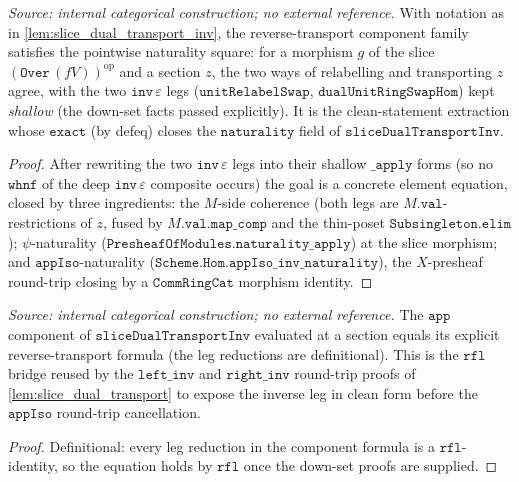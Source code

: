 \begin{lemma}
  \label{lem:slice_dual_transport_inv_naturality_apply}
  \textit{Source: internal categorical construction; no external reference.}
  With notation as in \cref{lem:slice_dual_transport_inv}, the reverse-transport component
  family satisfies the pointwise naturality square: for a morphism \(g\) of the slice
  \((\mathtt{Over}\,(fV))^{\mathrm{op}}\) and a section \(z\), the two ways of relabelling
  and transporting \(z\) agree, with the two \(\mathtt{inv}\,\varepsilon\) legs
  (\(\mathtt{unitRelabelSwap}\), \(\mathtt{dualUnitRingSwapHom}\)) kept \emph{shallow} (the
  down-set facts passed explicitly). It is the clean-statement extraction whose \(\mathtt{exact}\)
  (by defeq) closes the \(\mathtt{naturality}\) field of \(\mathtt{sliceDualTransportInv}\).
\end{lemma}
\begin{proof}
  \leanok
  After rewriting the two \(\mathtt{inv}\,\varepsilon\) legs into their shallow \(\mathtt{\_apply}\)
  forms (so no \(\mathtt{whnf}\) of the deep \(\mathtt{inv}\,\varepsilon\) composite occurs) the
  goal is a concrete element equation, closed by three ingredients: the \(M\)-side coherence
  (both legs are \(M.\mathtt{val}\)-restrictions of \(z\), fused by \(M.\mathtt{val}.\mathtt{map\_comp}\)
  and the thin-poset \(\mathtt{Subsingleton.elim}\)); \(\psi\)-naturality
  (\(\mathtt{PresheafOfModules.naturality\_apply}\)) at the slice morphism; and
  \(\mathtt{appIso}\)-naturality (\(\mathtt{Scheme.Hom.appIso\_inv\_naturality}\)), the
  \(X\)-presheaf round-trip closing by a \(\mathtt{CommRingCat}\) morphism identity.
\end{proof}

\begin{lemma}
  \label{lem:slice_dual_transport_inv_app_apply}
  \textit{Source: internal categorical construction; no external reference.}
  The \(\mathtt{app}\) component of \(\mathtt{sliceDualTransportInv}\) evaluated at a section
  equals its explicit reverse-transport formula (the leg reductions are definitional). This
  is the \(\mathtt{rfl}\) bridge reused by the \(\mathtt{left\_inv}\) and \(\mathtt{right\_inv}\)
  round-trip proofs of \cref{lem:slice_dual_transport} to expose the inverse leg in clean form
  before the \(\mathtt{appIso}\) round-trip cancellation.
\end{lemma}
\begin{proof}
  \leanok
  Definitional: every leg reduction in the component formula is a \(\mathtt{rfl}\)-identity, so
  the equation holds by \(\mathtt{rfl}\) once the down-set proofs are supplied.
\end{proof}

